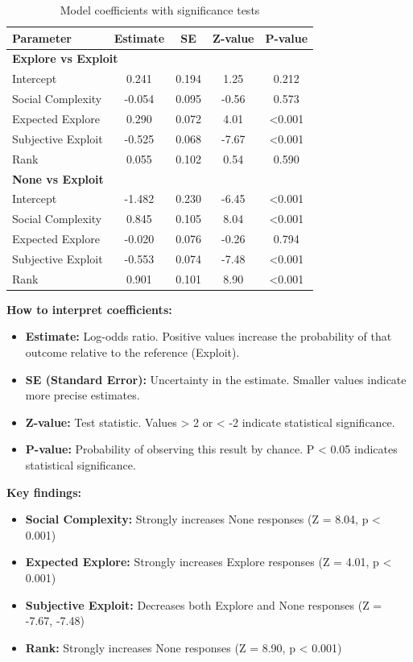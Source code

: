 \documentclass[11pt]{article}
\begin{document}
\begin{table}[h]
\centering
\begin{tabular}{lcccc}
\toprule
\textbf{Parameter} & \textbf{Estimate} & \textbf{SE} & \textbf{Z-value} & \textbf{P-value} \\
\midrule
\multicolumn{5}{l}{\textbf{Explore vs Exploit}} \\
\hline
Intercept & 0.241 & 0.194 & 1.25 & 0.212 \\
Social Complexity & -0.054 & 0.095 & -0.56 & 0.573 \\
Expected Explore & 0.290 & 0.072 & 4.01 & <0.001 \\
Subjective Exploit & -0.525 & 0.068 & -7.67 & <0.001 \\
Rank & 0.055 & 0.102 & 0.54 & 0.590 \\
\hline
\multicolumn{5}{l}{\textbf{None vs Exploit}} \\
\hline
Intercept & -1.482 & 0.230 & -6.45 & <0.001 \\
Social Complexity & 0.845 & 0.105 & 8.04 & <0.001 \\
Expected Explore & -0.020 & 0.076 & -0.26 & 0.794 \\
Subjective Exploit & -0.553 & 0.074 & -7.48 & <0.001 \\
Rank & 0.901 & 0.101 & 8.90 & <0.001 \\
\bottomrule
\end{tabular}
\caption{Model coefficients with significance tests}
\end{table}

\textbf{How to interpret coefficients:}
\begin{itemize}
    \item \textbf{Estimate:} Log-odds ratio. Positive values increase the probability of that outcome relative to the reference (Exploit).
    \item \textbf{SE (Standard Error):} Uncertainty in the estimate. Smaller values indicate more precise estimates.
    \item \textbf{Z-value:} Test statistic. Values > 2 or < -2 indicate statistical significance.
    \item \textbf{P-value:} Probability of observing this result by chance. P < 0.05 indicates statistical significance.
\end{itemize}

\textbf{Key findings:}
\begin{itemize}
    \item \textbf{Social Complexity:} Strongly increases None responses (Z = 8.04, p < 0.001)
    \item \textbf{Expected Explore:} Strongly increases Explore responses (Z = 4.01, p < 0.001)
    \item \textbf{Subjective Exploit:} Decreases both Explore and None responses (Z = -7.67, -7.48)
    \item \textbf{Rank:} Strongly increases None responses (Z = 8.90, p < 0.001)
\end{itemize}
\end{document}
